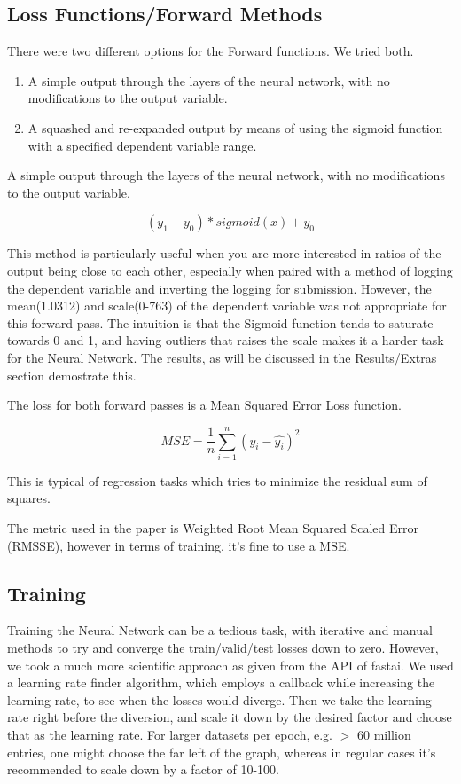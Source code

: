 \documentclass[10pt,twocolumn,letterpaper]{article}
\begin{document}
\subsection{Loss Functions/Forward Methods}
There were two different options for the Forward functions. We tried both.
\begin{enumerate}
  \item A simple output through the layers of the neural network, with no
  modifications to the output variable.
  \item A squashed and re-expanded output by means of using the sigmoid function
  with a specified dependent variable range.
\end{enumerate}
  A simple output through the layers of the neural network, with no
  modifications to the output variable.

\begin{equation}
  (y_1 - y_0) * sigmoid(x) + y_0
  \label{newEqn}
\end{equation}

  This method is particularly useful when you are more interested in ratios of
  the output being close to each other, especially when paired with a method of
  logging the dependent variable and inverting the logging for submission.
  However, the mean(1.0312) and scale(0-763) of the dependent variable was not
  appropriate for this forward pass. The intuition is that the Sigmoid function
  tends to saturate towards 0 and 1, and having outliers that raises the scale
  makes it a harder task for the Neural Network. The results, as will be
  discussed in the Results/Extras section demostrate this.

  The loss for both forward passes is a Mean Squared Error Loss function.

  \begin{equation}
    MSE = \frac{1}{n}\sum_{i=1}^{n} (y_i - \hat{y_i})^2
    \label{newEqn}
  \end{equation}

  This is typical of regression tasks which tries to minimize the residual sum
  of squares.

  The metric used in the paper is Weighted Root Mean Squared Scaled Error
  (RMSSE), however in terms of training, it’s fine to use a MSE.

\subsection{Training}
  Training the Neural Network can be a tedious task, with iterative and manual
  methods to try and converge the train/valid/test losses down to zero. However,
  we took a much more scientific approach as given from the API of fastai. We
  used a learning rate finder algorithm, which employs a callback while
  increasing the learning rate, to see when the losses would diverge. Then we
  take the learning rate right before the diversion, and scale it down by the
  desired factor and choose that as the learning rate. For larger datasets per
  epoch, e.g. $>$ 60 million entries, one might choose the far left of the
  graph, whereas in regular cases it’s recommended to scale down by a factor of
  10-100.
\end{document}
